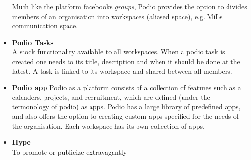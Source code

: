 \begin{itemize}
	Much like the platform facebooks \emph{groups}, Podio provides the option to divides members of an organisation into workspaces (aliased space), e.g. MiLs communication space.
	\item \textbf{Podio Tasks}\\
	A stock functionality available to all workspaces. When a podio task is created one needs to its title, description and when it should be done at the latest. A task is linked to its workspace and shared between all members.
	\item \textbf{Podio app}
	Podio as a platform consists of a collection of features such as a calenders, projects, and recruitment, which are defined (under the termonology of podio) as apps. Podio has a large library of predefined apps, and also offers the option to creating custom apps specified for the needs of the organisation. Each workspace has its own collection of apps.
	\item \textbf{Hype}\\
	To promote or publicize extravagantly

\end{itemize}